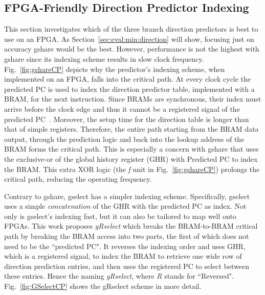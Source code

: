 \subsection{FPGA-Friendly Direction Predictor Indexing}
\label{sec:min:fpga:indexing}
This section investigates which of the three branch direction predictors is best to use on an FPGA. As Section~\ref{sec:eval:min:direction} will show, focusing just on accuracy gshare would be the best. However, performance is not the highest with gshare since its indexing scheme results in slow clock frequency. Fig.~\ref{fig:gshareCP} depicts why the predictor's indexing scheme, when implemented on an FPGA, falls into the critical path. At every clock cycle the predicted PC is used to index the direction predictor table, implemented with a BRAM, for the next instruction. Since BRAMs are synchronous, their index must arrive before the clock edge and thus it cannot be a registered signal of the predicted PC~\cite{StratixIVM9K}. Moreover, the setup time for the direction table is longer than that of simple registers. Therefore, the entire path starting from the BRAM data output, through the prediction logic and back into the lookup address of the BRAM forms the critical path. This is especially a concern with gshare that uses the exclusive-or of the global history register (GHR) with Predicted PC to index the BRAM. This extra XOR logic (the \textit{f} unit in Fig.~\ref{fig:gshareCP}) prolongs the critical path, reducing the operating frequency.


Contrary to gshare, gselect has a simpler indexing scheme. Specifically, gselect uses a simple \textit{concatenation} of the GHR with the predicted PC as index. Not only is gselect's indexing fast, but it can also be tailored to map well onto FPGAs. This work proposes \textit{gRselect} which breaks the BRAM-to-BRAM critical path by breaking the BRAM access into two parts, the first of which does not need to be the ``predicted PC". It reverses the indexing order and uses GHR, which is a registered signal, to index the BRAM to retrieve one wide row of direction prediction entries, and then uses the registered PC to select between these entries. Hence the naming \textit{gRselect}, where \textit{R} stands for ``Reversed". Fig.~\ref{fig:GSelectCP} shows the gRselect scheme in more detail.

